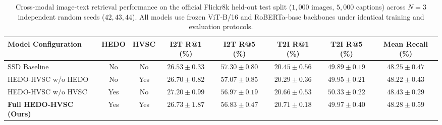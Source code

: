 \documentclass[11pt,journal,onecolumn,draftcls]{IEEEtran}
\begin{document}
\begin{table}[t]
\centering
\caption{Cross-modal image-text retrieval performance on the official Flickr8k held-out test split ($1{,}000$ images, $5{,}000$ captions) across $N=3$ independent random seeds ($42, 43, 44$). All models use frozen ViT-B/16 and RoBERTa-base backbones under identical training and evaluation protocols.}
\label{tab:main_results}
\begin{tabular}{lccccccc}
\toprule
\textbf{Model Configuration} & \textbf{HEDO} & \textbf{HVSC} & \textbf{I2T R@1 (\%)} & \textbf{I2T R@5 (\%)} & \textbf{T2I R@1 (\%)} & \textbf{T2I R@5 (\%)} & \textbf{Mean Recall (\%)} \\
\midrule
SSD Baseline & No & No & $26.53 \pm 0.33$ & $57.30 \pm 0.80$ & $20.45 \pm 0.56$ & $49.89 \pm 0.19$ & $48.25 \pm 0.47$ \\
HEDO-HVSC w/o HEDO & No & Yes & $26.70 \pm 0.82$ & $57.07 \pm 0.85$ & $20.29 \pm 0.36$ & $49.95 \pm 0.21$ & $48.22 \pm 0.43$ \\
HEDO-HVSC w/o HVSC & Yes & No & $\mathbf{27.20 \pm 0.99}$ & $56.97 \pm 0.19$ & $20.66 \pm 0.53$ & $\mathbf{50.33 \pm 0.22}$ & $\mathbf{48.43 \pm 0.29}$ \\
\textbf{Full HEDO-HVSC (Ours)} & Yes & Yes & $26.73 \pm 1.87$ & $\mathbf{56.83 \pm 0.47}$ & $\mathbf{20.71 \pm 0.18}$ & $49.97 \pm 0.40$ & $\mathbf{48.28 \pm 0.59}$ \\
\bottomrule
\end{tabular}
\end{table}
\end{document}
